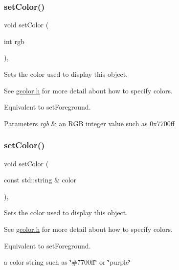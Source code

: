 \subsubsection{\texorpdfstring{set\+Color()}{setColor()}\hspace{0.1cm}{\footnotesize\ttfamily [2/3]}}
{\footnotesize\ttfamily void set\+Color (\begin{DoxyParamCaption}\item[{int}]{rgb }\end{DoxyParamCaption})\hspace{0.3cm}{\ttfamily [virtual]}, {\ttfamily [inherited]}}



Sets the color used to display this object. 

See \mbox{\hyperlink{gcolor_8h_source}{gcolor.\+h}} for more detail about how to specify colors.

Equivalent to set\+Foreground.


\begin{DoxyParams}{Parameters}
{\em rgb} & an R\+GB integer value such as 0x7700ff \\
\hline
\end{DoxyParams}
\mbox{\label{classGObject_a61374df6c11b52cfbb0815decdbaebc6}} 
\subsubsection{\texorpdfstring{set\+Color()}{setColor()}\hspace{0.1cm}{\footnotesize\ttfamily [3/3]}}
{\footnotesize\ttfamily void set\+Color (\begin{DoxyParamCaption}\item[{const std\+::string \&}]{color }\end{DoxyParamCaption})\hspace{0.3cm}{\ttfamily [virtual]}, {\ttfamily [inherited]}}



Sets the color used to display this object. 

See \mbox{\hyperlink{gcolor_8h_source}{gcolor.\+h}} for more detail about how to specify colors.

Equivalent to set\+Foreground.

a color string such as \char`\"{}\#7700ff\char`\"{} or \char`\"{}purple\char`\"{} \mbox{\label{classGObject_ad767a33971159e9493e221cca4c00ae9}} 

